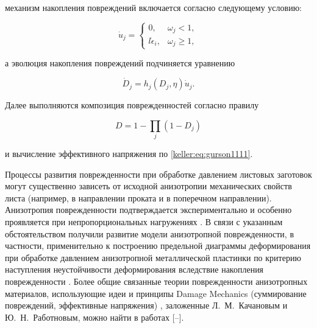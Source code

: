 механизм накопления повреждений включается согласно следующему условию:

\begin{equation}

	\dot{u}_j=

\left\{	

	\begin{array}{cc}

	0,& \omega_j< 1,\\

	l\dot{\epsilon}_i,& \omega_j\geq 1,

	\end{array}

\right.

\end{equation} 

а эволюция накопления повреждений подчиняется уравнению

\begin{equation}

	\dot{D}_j=h_j(D_j,\eta)\dot{u}_j.

\end{equation} 

Далее выполняются композиция поврежденностей согласно правилу

\begin{equation}

	D=1-\prod_j(1-D_j)

\end{equation}

и вычисление эффективного напряжения по \eqref{keller:eq:gurson1111}. 



Процессы развития поврежденности при обработке давлением листовых заготовок могут существенно зависеть от исходной анизотропии механических свойств листа (например, в направлении проката и в поперечном направлении). Анизотропия поврежденности подтверждается экспериментально и особенно проявляется при непропорциональных нагружениях \cite{keller:bib:chaboche}. В связи с указанным обстоятельством получили развитие модели анизотропной поврежденности, в частности, применительно к построению предельной диаграммы деформирования при обработке давлением анизотропной металлической пластинки по критерию наступления неустойчивости деформирования вследствие накопления поврежденности \cite{keller:bib:lee}. Более общие связанные теории поврежденности анизотропных материалов, использующие идеи и принципы Damage Mechanics (суммирование повреждений, эффективные напряжения)  \cite{keller:bib:volk, keller:bib:mura}, заложенные Л.~М.~Качановым и Ю.~Н.~Работновым, можно найти в работах [--]. 



